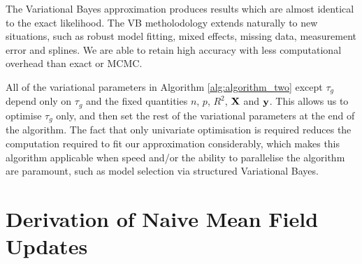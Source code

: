 \documentclass{amsart}[12pt]
\begin{document}
The Variational Bayes approximation produces results which are almost identical to the exact likelihood.
The VB metholodology extends naturally to new situations, such as robust model fitting, mixed effects, missing
data, measurement error and splines. We are able to retain high accuracy with less computational overhead than
exact or MCMC.

All of the variational parameters in Algorithm \ref{alg:algorithm_two} except $\tau_g$ depend only on
$\tau_g$ and the fixed quantities $n$, $p$, $R^2$, ${\bf X}$ and ${\bf y}$. This allows us to optimise $\tau_g$
only, and then set the rest of the variational parameters at the end of the algorithm. The fact that only
univariate optimisation is required reduces the computation required to fit our approximation considerably,
which makes this algorithm applicable when speed and/or the ability to parallelise the algorithm are
paramount, such as model selection via structured Variational Bayes.




\appendix
\section{Derivation of Naive Mean Field Updates}
\label{sec:appendix}
\end{document}
